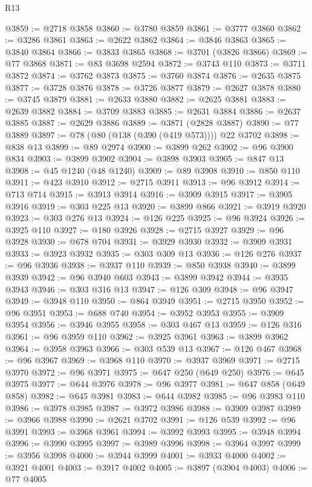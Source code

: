 \begin{lexlean}{R13}
\begin{coremodule}
@3859 := @2718 @3858
@3860 := @3780 @3859
@3861 := @3777 @3860
@3862 := @3286 @3861
@3863 := @2622 @3862
@3864 := @3846 @3863
@3865 := @3840 @3864
@3866 := @3833 @3865
@3868 := @3701 (@3826 @3866)
@3869 := @77 @3868
@3871 := @83 @3698 @2594
@3872 := @3743 @110
@3873 := @3711 @3872
@3874 := @3762 @3873
@3875 := @3760 @3874
@3876 := @2635 @3875
@3877 := @3728 @3876
@3878 := @3726 @3877
@3879 := @2627 @3878
@3880 := @3745 @3879
@3881 := @2633 @3880
@3882 := @2625 @3881
@3883 := @2639 @3882
@3884 := @3709 @3883
@3885 := @2631 @3884
@3886 := @2637 @3885
@3887 := @2629 @3886
@3889 := @3871 (@2828 @3887)
@3890 := @77 @3889
@3897 := @78 (@80 (@138 (@390 (@419 @573)))) @22 @3702
@3898 := @838 @13
@3899 := @89 @2974
@3900 := @3899 @262
@3902 := @96 @3900 @834
@3903 := @3899 @3902
@3904 := @3898 @3903
@3905 := @847 @13
@3908 := @45 @1240 (@48 @1240)
@3909 := @89 @3908
@3910 := @850 @110
@3911 := @423 @3910
@3912 := @2715 @3911
@3913 := @96 @3912
@3914 := @713 @714
@3915 := @3913 @3914
@3916 := @3909 @3915
@3917 := @3905 @3916
@3919 := @303 @225 @13
@3920 := @3899 @866
@3921 := @3919 @3920
@3923 := @303 @276 @13
@3924 := @126 @225
@3925 := @96 @3924
@3926 := @3925 @110
@3927 := @180 @3926
@3928 := @2715 @3927
@3929 := @96 @3928
@3930 := @678 @704
@3931 := @3929 @3930
@3932 := @3909 @3931
@3933 := @3923 @3932
@3935 := @303 @309 @13
@3936 := @126 @276
@3937 := @96 @3936
@3938 := @3937 @110
@3939 := @850 @3938
@3940 := @3899 @3939
@3942 := @96 @3940 @603
@3943 := @3899 @3942
@3944 := @3935 @3943
@3946 := @303 @316 @13
@3947 := @126 @309
@3948 := @96 @3947
@3949 := @3948 @110
@3950 := @864 @3949
@3951 := @2715 @3950
@3952 := @96 @3951
@3953 := @688 @740
@3954 := @3952 @3953
@3955 := @3909 @3954
@3956 := @3946 @3955
@3958 := @303 @467 @13
@3959 := @126 @316
@3961 := @96 @3959 @110
@3962 := @3925 @3961
@3963 := @3899 @3962
@3964 := @3958 @3963
@3966 := @303 @539 @13
@3967 := @126 @467
@3968 := @96 @3967
@3969 := @3968 @110
@3970 := @3937 @3969
@3971 := @2715 @3970
@3972 := @96 @3971
@3975 := @647 @250 (@649 @250)
@3976 := @645 @3975
@3977 := @644 @3976
@3978 := @96 @3977
@3981 := @647 @858 (@649 @858)
@3982 := @645 @3981
@3983 := @644 @3982
@3985 := @96 @3983 @110
@3986 := @3978 @3985
@3987 := @3972 @3986
@3988 := @3909 @3987
@3989 := @3966 @3988
@3990 := @2621 @3702
@3991 := @126 @539
@3992 := @96 @3991
@3993 := @3968 @3961
@3994 := @3992 @3993
@3995 := @3948 @3994
@3996 := @3990 @3995
@3997 := @3989 @3996
@3998 := @3964 @3997
@3999 := @3956 @3998
@4000 := @3944 @3999
@4001 := @3933 @4000
@4002 := @3921 @4001
@4003 := @3917 @4002
@4005 := @3897 (@3904 @4003)
@4006 := @77 @4005

\end{coremodule}
\end{lexlean}
